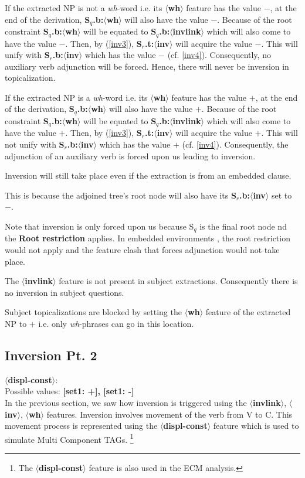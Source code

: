 If the extracted NP is not a {\em wh}-word i.e. its {\bf $\langle$wh$\rangle$}
feature has the value $-$, at the end of the derivation, 
{\bf S$_{q}$.b:$\langle$wh$\rangle$} will also have the value $-$. Because of
the root constraint {\bf S$_{q}$.b:$\langle$wh$\rangle$} will be equated 
to {\bf S$_{q}$.b:$\langle$invlink$\rangle$} which will also come to have 
the value $-$. Then, by (\ref{inv3}), {\bf S$_{r}$.t:$\langle$inv$\rangle$} 
will acquire the value $-$. This will unify with {\bf S$_{r}$.b:$\langle$inv$\rangle$}
which has the value $-$ (cf. \ref{inv4}). Consequently, no auxiliary verb
adjunction will be forced. Hence, there will never be inversion in topicalization.

If the extracted NP is a {\em wh}-word i.e. its {\bf $\langle$wh$\rangle$} 
feature has the value $+$, at the end of the derivation, 
{\bf S$_{q}$.b:$\langle$wh$\rangle$} will also have the value $+$. Because of
the root constraint {\bf S$_{q}$.b:$\langle$wh$\rangle$} will be equated 
to {\bf S$_{q}$.b:$\langle$invlink$\rangle$} which will also come to have
the value $+$. Then, by (\ref{inv3}), {\bf S$_{r}$.t:$\langle$inv$\rangle$} 
will acquire the value $+$. This will not unify with {\bf S$_{r}$.b:$\langle$inv$\rangle$}
which has the value $+$ (cf. \ref{inv4}). Consequently, the adjunction
of an auxiliary verb is forced upon us leading to inversion.

Inversion will still take place even if the extraction is from an embedded
clause.


This is because the adjoined tree's root node will also have its 
{\bf S$_{r}$.b:$\langle$inv$\rangle$} set to $-$. 


Note that inversion is only forced upon us because S$_{q}$ is the final root node
nd the {\bf Root restriction} applies. In embedded environments , the 
root restriction would not apply and the feature clash that forces adjunction
would not take place. 

The {\bf $\langle$invlink$\rangle$} feature is not present in subject extractions.
Consequently there is no inversion in subject questions.

Subject topicalizations are blocked by setting the 
{\bf $\langle$wh$\rangle$} feature of the extracted NP to $+$ i.e. only
{\em wh}-phrases can go in this location. 

\subsection{Inversion Pt. 2}
{\bf $\langle$displ-const$\rangle$}:\\
Possible values: {\bf [set1: +], [set1: -]}\\
In the previous section, we saw how inversion is triggered using the
{\bf $\langle$invlink$\rangle$}, {\bf $\langle$inv$\rangle$},
{\bf $\langle$wh$\rangle$} features. Inversion involves movement
of the verb from V to C. This movement process is represented
using the {\bf $\langle$displ-const$\rangle$} feature which is
used to simulate Multi Component TAGs. 
\footnote{The {\bf $\langle$displ-const$\rangle$} feature is also used 
in the ECM analysis.}

